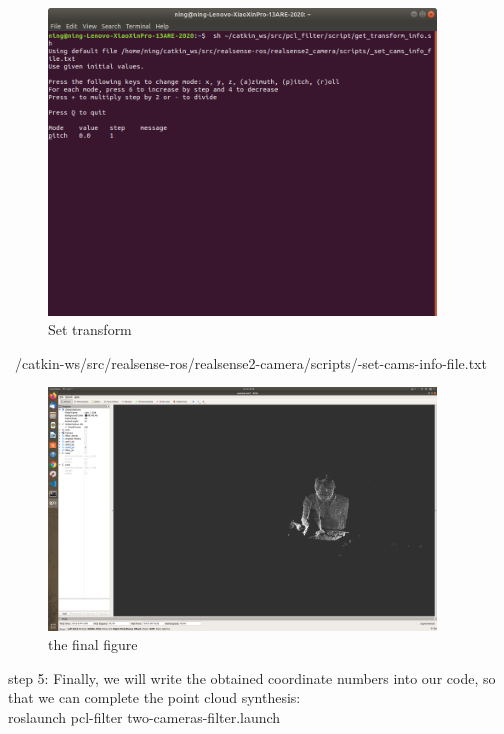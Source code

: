 \begin{figure}[htp]
	\centering %
	\includegraphics[width = 10.3cm]{figures/set}
	\caption{Set transform}
	\label{fig:figure1label}
\end{figure}
   ~/catkin-ws/src/realsense-ros/realsense2-camera/scripts/-set-cams-info-file.txt\\
\begin{figure}[htp]
	\centering %
	\includegraphics[width = 10.3cm]{figures/final}
	\caption{ the final figure}
	\label{fig:figure1label}
\end{figure}
step 5:
Finally, we will write the obtained coordinate numbers into our code, so that we can complete the point cloud synthesis:\\
roslaunch pcl-filter two-cameras-filter.launch\\




